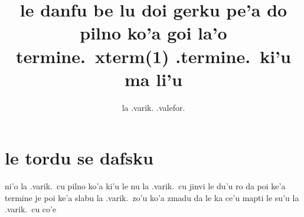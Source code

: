 \documentclass{article}
\title{le danfu be lu doi gerku pe'a do pilno ko'a goi la'o termine.\ xterm(1) .termine.\ ki'u ma li'u}
\author{la .varik. .valefor.}
\begin{document}
\maketitle

\section{le tordu se dafsku}
ni'o la .varik.\ cu pilno ko'a ki'u le nu la .varik.\ cu jinvi le du'u ro da poi ke'a termine je poi ke'a slabu la .varik.\ zo'u ko'a zmadu da le ka ce'u mapti le su'u la .varik.\ cu co'e
\end{document}
